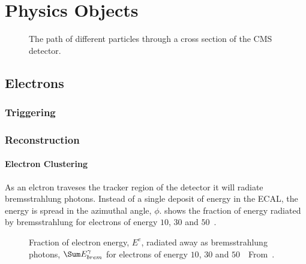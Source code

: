 \chapter{Physics Objects}


\begin{figure}[htb]
  \centering
  \caption{The path of different particles through a cross section of the CMS detector.}
  \label{phob:crosssec}
\end{figure}

\section{Electrons}

\subsection{Triggering}

\subsection{Reconstruction}

\subsubsection{Electron Clustering}
As an elctron traveses the tracker region of the detector it will radiate
bremsstrahlung photons. Instead of a single deposit of energy in the ECAL, the
energy is spread in the azimuthal angle, $\phi$.
 shows the fraction of energy radiated by bremsstrahlung for
electrons of energy $10$, $30$ and \unit{$50$}{\GeV}.

\begin{figure}[htb]
  \centering
  \caption{Fraction of electron energy, $E^{e}$, radiated away as bremsstrahlung
photons, $\Sum E_{brem}^{\gamma}$ for electrons of energy $10$, $30$ and
\unit{$50$}{\GeV}. From \cite{}.}
  \label{reco:brem}
\end{figure}




